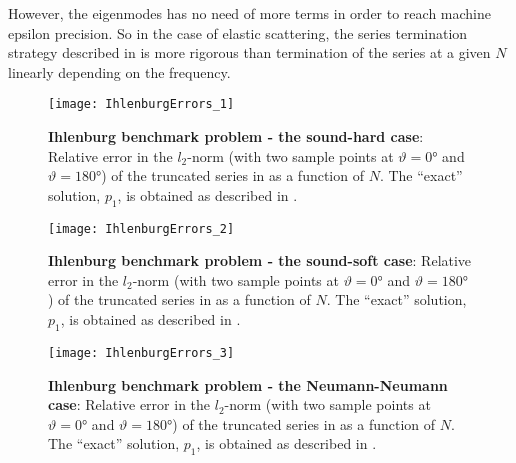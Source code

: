 However, the eigenmodes has no need of more terms in order to reach machine epsilon precision. So in the case of elastic scattering, the series termination strategy described in  is more rigorous than termination of the series at a given $N$ linearly depending on the frequency.
\begin{figure}
	\centering
	\texttt{[image: IhlenburgErrors\_1]}
		\caption{\textbf{Ihlenburg benchmark problem - the sound-hard case}: Relative error in the $l_2$-norm (with two sample points at $\vartheta = \ang{0}$ and $\vartheta = \ang{180}$) of the truncated series in  as a function of $N$. The ``exact'' solution, $p_1$, is obtained as described in .}
	\label{Fig1:IhlenburgErrors1}
\end{figure}
\begin{figure}
	\centering
	\texttt{[image: IhlenburgErrors\_2]}
		\caption{\textbf{Ihlenburg benchmark problem - the sound-soft case}: Relative error in the $l_2$-norm (with two sample points at $\vartheta = \ang{0}$ and $\vartheta = \ang{180}$) of the truncated series in  as a function of $N$. The ``exact'' solution, $p_1$, is obtained as described in .}
	\label{Fig1:IhlenburgErrors2}
\end{figure}
\begin{figure}
	\centering
	\texttt{[image: IhlenburgErrors\_3]}
		\caption{\textbf{Ihlenburg benchmark problem - the Neumann-Neumann case}: Relative error in the $l_2$-norm (with two sample points at $\vartheta = \ang{0}$ and $\vartheta = \ang{180}$) of the truncated series in  as a function of $N$. The ``exact'' solution, $p_1$, is obtained as described in .}
	\label{Fig1:IhlenburgErrors3}
\end{figure}

